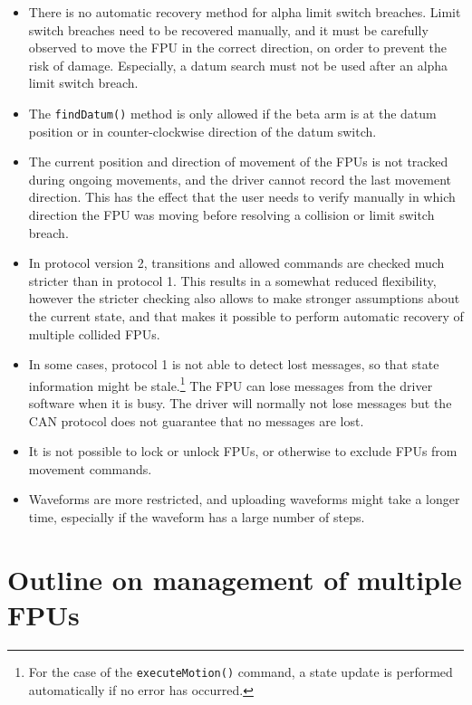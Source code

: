 \documentclass{scrartcl}[12pt,a4paper]
\begin{document}
\begin{itemize}
\item There is no automatic recovery method for alpha
  limit switch breaches. Limit switch breaches need
  to be recovered manually, and it must be carefully
  observed to move the FPU in the correct direction,
  on order to prevent the risk of damage. Especially,
  a datum search must not be used after an alpha limit switch
  breach.

\item The \texttt{findDatum()} method is only allowed if the beta arm
  is at the datum position or in counter-clockwise direction of the
  datum switch.

\item The current position and direction of movement of the FPUs is
  not tracked during ongoing movements, and the driver cannot record
  the last movement direction. This has the effect that the user needs
  to verify manually in which direction the FPU was moving before
  resolving a collision or limit switch breach.

\item In protocol version 2, transitions and allowed commands are
  checked much stricter than in protocol 1.  This results in a
  somewhat reduced flexibility, however the stricter checking also
  allows to make stronger assumptions about the current state, and
  that makes it possible to perform automatic recovery of multiple
  collided FPUs.
  
\item In some cases, protocol 1 is not able to detect lost messages,
  so that state information might be stale.\footnote{For the case of
    the \texttt{executeMotion()} command, a state update is performed
    automatically if no error has occurred.} The FPU can lose messages
  from the driver software when it is busy. The driver will normally
  not lose messages but the CAN protocol does not guarantee that no
  messages are lost.
  

\item It is not possible to lock or unlock FPUs, or otherwise to
  exclude FPUs from movement commands.
  
\item Waveforms are more restricted, and uploading waveforms might
  take a longer time, especially if the waveform has a large number of
  steps.
  
\end{itemize}

\section{Outline on management of multiple FPUs}
\end{document}
